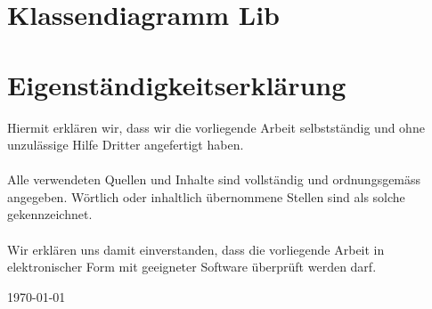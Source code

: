 \documentclass[a4paper,12pt]{report}
\begin{document}
    \vspace*{\fill}
    

    \vspace*{\fill}
    \thispagestyle{empty}
    \titleformat{\section}{\centering\normalfont\Large\bfseries}{\thesection}{1em}{}


    \section{Klassendiagramm Lib}
    \label{sec:class-diag-lib}

    \begingroup
    \renewcommand{\thefootnote}{\roman{footnote}}
    \endgroup

    \vspace*{\fill}
    


    \section{Eigenständigkeitserklärung}
    Hiermit erklären wir, dass wir die vorliegende Arbeit selbstständig und ohne unzulässige Hilfe Dritter angefertigt haben.
    \\\\
    Alle verwendeten Quellen und Inhalte sind vollständig und ordnungsgemäss angegeben.
    Wörtlich oder inhaltlich übernommene Stellen sind als solche gekennzeichnet.
    \\\\
    Wir erklären uns damit einverstanden, dass die vorliegende Arbeit in elektronischer Form mit geeigneter Software überprüft werden darf.

    \begin{flushleft}
        \today
    \end{flushleft}
\end{document}

